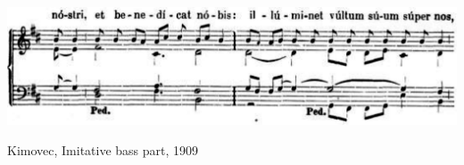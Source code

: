 \vspace*{\fill}

\begin{example}
  \centering
  \includegraphics[width=\linewidth]{c/4/ex/premrl_imitate_14.png}
  \caption{Kimovec, Imitative bass part, 1909}
  \label{mus:premrl_imitate_14}
\end{example}

\vspace*{\fill}

\newpage
